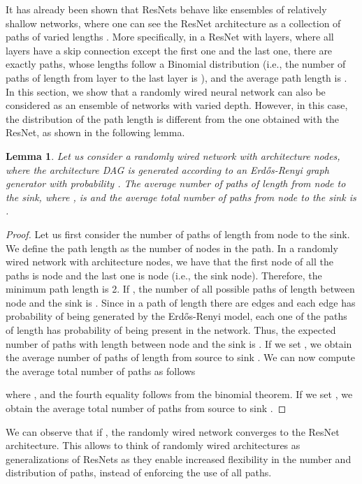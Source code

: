 \documentclass[10pt,twocolumn,twoside]{IEEEtran}
\newtheorem{lemma}[theorem]{Lemma}
\begin{document}
It has already been shown that ResNets behave like ensembles of relatively shallow networks, where one can see the ResNet architecture as a collection of paths of varied lengths \cite{veit2016residual}. More specifically, in a ResNet with  layers, where all layers have a skip connection except the first one and the last one, there are exactly  paths, whose lengths follow a Binomial distribution (i.e., the number of paths of length  from layer  to the last layer is ), and the average path length is  \cite{veit2016residual}. In this section, we show that a randomly wired neural network can also be considered as an ensemble of networks with varied depth. However, in this case, the distribution of the path length is different from the one obtained with the ResNet, as shown in the following lemma.
\begin{lemma}
Let us consider a randomly wired network with  architecture nodes, where the architecture DAG is generated according to an Erd\H{o}s-Renyi graph generator with probability . The average number of paths of length  from node  to the sink, where , is  and the average total number of paths from node  to the sink is . 
\label{lemma1}
\end{lemma}
\begin{proof}
Let us first consider the number of paths of length  from node  to the sink. We define the path length as the number of nodes in the path.  In a randomly wired network with  architecture nodes, we have that the first node of all the paths is node  and the last one is node  (i.e., the sink node). Therefore, the minimum path length is 2. If , the number of all possible paths of length  between node  and the sink is . Since in a path of length  there are  edges and each edge has probability  of being generated by the Erd\H{o}s-Renyi model, each one of the paths of length  has probability  of being present in the network. Thus, the expected number of paths with length  between node  and the sink is . If we set , we obtain the average number of paths of length  from source to sink . We can now compute the average total number of paths  as follows

where ,  and the fourth equality follows from the binomial theorem. If we set , we obtain the average total number of paths from source to sink .
\end{proof}
We can observe that if , the randomly wired network converges to the ResNet architecture. This allows to think of randomly wired architectures as generalizations of ResNets as they enable increased flexibility in the number and distribution of paths, instead of enforcing the use of all  paths.
\end{document}
